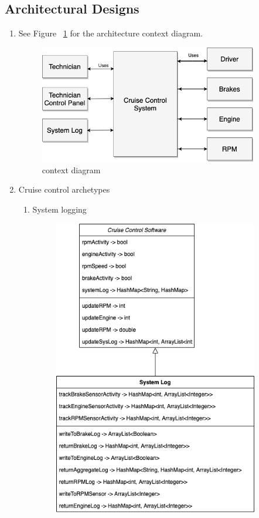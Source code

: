 \documentclass[preprint,11pt,3p]{article}
\begin{document}
\subsection{Architectural Designs} 
\begin{enumerate}
	\item See Figure ~\ref{fig:context} for the architecture context diagram.
		\begin{figure}[H]
			\includegraphics[width=0.9\textwidth]{images/Architectural_Context_Diagram.png}
			\caption{context diagram}
			\label{fig:context}
		\end{figure}
	\item Cruise control archetypes
		\begin{enumerate}
			\item System logging
				\begin{figure}[H]
					\includegraphics[width=0.9\textwidth]{images/classMapCS347_logging.png}

\end{figure}
\end{enumerate}
\end{enumerate}
\end{document}
